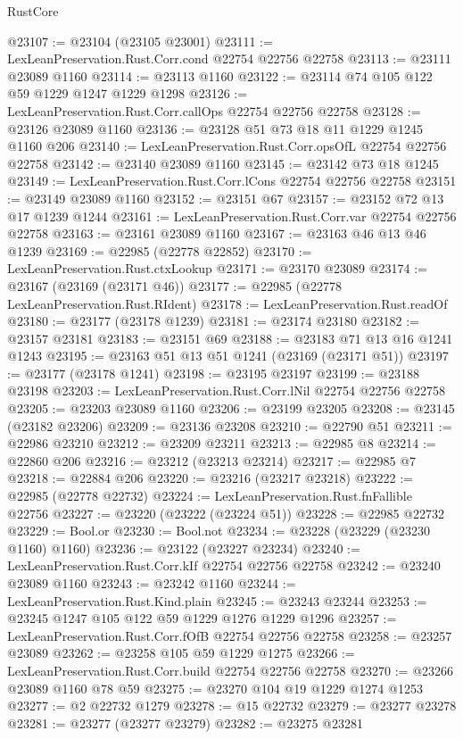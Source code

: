 \begin{lexlean}{RustCore}
\begin{coremodule}
@23107 := @23104 (@23105 @23001)
@23111 := LexLeanPreservation.Rust.Corr.cond @22754 @22756 @22758
@23113 := @23111 @23089 @1160
@23114 := @23113 @1160
@23122 := @23114 @74 @105 @122 @59 @1229 @1247 @1229 @1298
@23126 := LexLeanPreservation.Rust.Corr.callOps @22754 @22756 @22758
@23128 := @23126 @23089 @1160
@23136 := @23128 @51 @73 @18 @11 @1229 @1245 @1160 @206
@23140 := LexLeanPreservation.Rust.Corr.opsOfL @22754 @22756 @22758
@23142 := @23140 @23089 @1160
@23145 := @23142 @73 @18 @1245
@23149 := LexLeanPreservation.Rust.Corr.lCons @22754 @22756 @22758
@23151 := @23149 @23089 @1160
@23152 := @23151 @67
@23157 := @23152 @72 @13 @17 @1239 @1244
@23161 := LexLeanPreservation.Rust.Corr.var @22754 @22756 @22758
@23163 := @23161 @23089 @1160
@23167 := @23163 @46 @13 @46 @1239
@23169 := @22985 (@22778 @22852)
@23170 := LexLeanPreservation.Rust.ctxLookup
@23171 := @23170 @23089
@23174 := @23167 (@23169 (@23171 @46))
@23177 := @22985 (@22778 LexLeanPreservation.Rust.RIdent)
@23178 := LexLeanPreservation.Rust.readOf
@23180 := @23177 (@23178 @1239)
@23181 := @23174 @23180
@23182 := @23157 @23181
@23183 := @23151 @69
@23188 := @23183 @71 @13 @16 @1241 @1243
@23195 := @23163 @51 @13 @51 @1241 (@23169 (@23171 @51))
@23197 := @23177 (@23178 @1241)
@23198 := @23195 @23197
@23199 := @23188 @23198
@23203 := LexLeanPreservation.Rust.Corr.lNil @22754 @22756 @22758
@23205 := @23203 @23089 @1160
@23206 := @23199 @23205
@23208 := @23145 (@23182 @23206)
@23209 := @23136 @23208
@23210 := @22790 @51
@23211 := @22986 @23210
@23212 := @23209 @23211
@23213 := @22985 @8
@23214 := @22860 @206
@23216 := @23212 (@23213 @23214)
@23217 := @22985 @7
@23218 := @22884 @206
@23220 := @23216 (@23217 @23218)
@23222 := @22985 (@22778 @22732)
@23224 := LexLeanPreservation.Rust.fnFallible @22756
@23227 := @23220 (@23222 (@23224 @51))
@23228 := @22985 @22732
@23229 := Bool.or
@23230 := Bool.not
@23234 := @23228 (@23229 (@23230 @1160) @1160)
@23236 := @23122 (@23227 @23234)
@23240 := LexLeanPreservation.Rust.Corr.kIf @22754 @22756 @22758
@23242 := @23240 @23089 @1160
@23243 := @23242 @1160
@23244 := LexLeanPreservation.Rust.Kind.plain
@23245 := @23243 @23244
@23253 := @23245 @1247 @105 @122 @59 @1229 @1276 @1229 @1296
@23257 := LexLeanPreservation.Rust.Corr.fOfB @22754 @22756 @22758
@23258 := @23257 @23089
@23262 := @23258 @105 @59 @1229 @1275
@23266 := LexLeanPreservation.Rust.Corr.build @22754 @22756 @22758
@23270 := @23266 @23089 @1160 @78 @59
@23275 := @23270 @104 @19 @1229 @1274 @1253
@23277 := @2 @22732 @1279
@23278 := @15 @22732
@23279 := @23277 @23278
@23281 := @23277 (@23277 @23279)
@23282 := @23275 @23281

\end{coremodule}
\end{lexlean}
